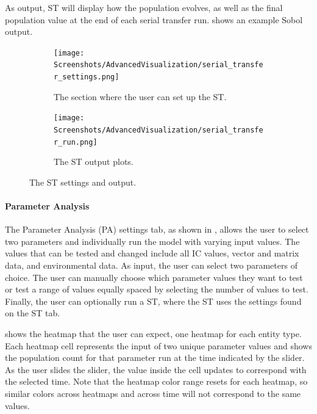 As output, ST will display how the population evolves, as well as the final population value at the end of each serial transfer run. 
 shows an example Sobol output. 

\begin{figure}[h!]
    \centering
    \begin{subfigure}{0.49\linewidth}
        \centering
        \captionsetup{width=1\linewidth}
        \texttt{[image: Screenshots/AdvancedVisualization/serial\_transfer\_settings.png]}
        \caption{
            The section where the user can set up the ST.
        }
        \label{fig:ss:av:serial_transfer_settings}
    \end{subfigure}
    \hfill
    \begin{subfigure}{0.49\linewidth}
        \centering
        \captionsetup{width=1\linewidth}
        \texttt{[image: Screenshots/AdvancedVisualization/serial\_transfer\_run.png]}
        \caption{
            The ST output plots. 
        }
        \label{fig:ss:av:serial_transfer_run}
    \end{subfigure}
    \caption{The ST settings and output.}
\end{figure}

\paragraph{Parameter Analysis}
\label{sec:parameter_analysis}
The Parameter Analysis (PA) settings tab, as shown in , allows the user to select two parameters and individually run the model with varying input values.
The values that can be tested and changed include all IC values, vector and matrix data, and environmental data.
As input, the user can select two parameters of choice.
The user can manually choose which parameter values they want to test or test a range of values equally spaced by selecting the number of values to test.
Finally, the user can optionally run a ST, where the ST uses the settings found on the ST tab. 

 shows the heatmap that the user can expect, one heatmap for each entity type.
Each heatmap cell represents the input of two unique parameter values and shows the population count for that parameter run at the time indicated by the slider. 
As the user slides the slider, the value inside the cell updates to correspond with the selected time. 
Note that the heatmap color range resets for each heatmap, so similar colors across heatmaps and across time will not correspond to the same values.

